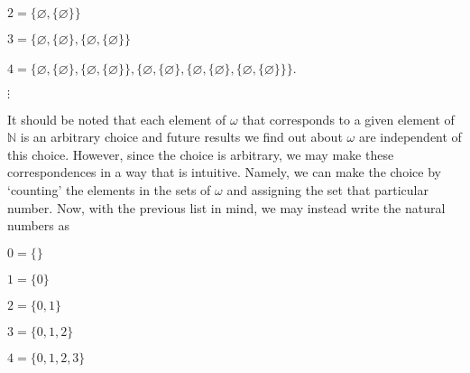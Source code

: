 \documentclass[12pt, a4paper]{article}
\begin{document}
\vspace{2mm}

\hspace{25mm}$2=\{\varnothing,\{\varnothing\}\}$

\vspace{2mm}

\hspace{25mm}$3=\{\varnothing,\{\varnothing\},\{\varnothing,\{\varnothing\}\}$

\vspace{2mm}

\centerline{$4=\{\varnothing,\{\varnothing\},\{\varnothing,\{\varnothing\}\},\{\varnothing,\{\varnothing\},\{\varnothing,\{\varnothing\},\{\varnothing,\{\varnothing\}\}\}$.}

\vspace{2mm}

\hspace{29.5mm}$\vdots$

\vspace{4mm}

\noindent It should be noted that each element of $\omega$ that corresponds to a given element of $\mathbb{N}$ is an arbitrary choice and future results we find out about $\omega$ are independent of this choice. However, since the choice is arbitrary, we may make these correspondences in a way that is intuitive. Namely, we can make the choice by `counting' the elements in the sets of $\omega$ and assigning the set that particular number. Now, with the previous list in mind, we may instead write the natural numbers as\par

\vspace{4mm}

\hspace{60.5mm}$0=\{\}$

\vspace{2mm}

\hspace{60.5mm}$1=\{0\}$

\vspace{2mm}

\hspace{60.5mm}$2=\{0,1\}$

\vspace{2mm}

\hspace{60.5mm}$3=\{0,1,2\}$

\vspace{2mm}

\centerline{$4=\{0,1,2,3\}$}
\end{document}
